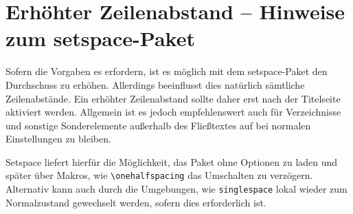 \documentclass[
	german,%
	ruledheaders=chapter,%
	class=book,%
	thesis={%
			type=dr,
			dr=rernat
		},
	fontsize=11pt,%
	parskip=half-,%
	custommargins=true,%
	marginpar=false,%
	accentcolor=9c,%
]{tudapub}
\let\code\texttt
\let\tbs\textbackslash
\begin{document}
\section{Erhöhter Zeilenabstand -- Hinweise zum setspace-Paket}
Sofern die Vorgaben es erfordern, ist es möglich mit dem setspace-Paket den Durchschuss zu erhöhen. Allerdings beeinflusst dies natürlich sämtliche Zeilenabstände. Ein erhöhter Zeilenabstand sollte daher erst nach der Titelseite aktiviert werden. Allgemein ist es jedoch empfehlenswert auch für Verzeichnisse und sonstige Sonderelemente außerhalb des Fließtextes auf bei normalen Einstellungen zu bleiben.

Setspace liefert hierfür die Möglichkeit, das Paket ohne Optionen zu laden und später über Makros, wie \code{\tbs{}onehalfspacing} das Umschalten zu verzögern. Alternativ kann auch durch die Umgebungen, wie \code{singlespace} lokal wieder zum Normalzustand gewechselt werden, sofern dies erforderlich ist.

\printbibliography
\end{document}

